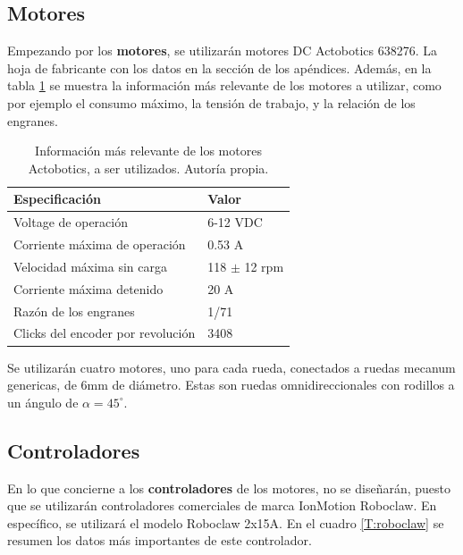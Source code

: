 \subsection{Motores}

Empezando por los \textbf{motores}, se utilizarán motores DC Actobotics 638276. La hoja de fabricante con los datos en la sección de los apéndices. Además, en la tabla \ref{T:actobotics} se muestra la información más relevante de los motores a utilizar, como por ejemplo el consumo máximo, la tensión de trabajo, y la relación de los engranes.

\begin{table}[H]
\caption{Información más relevante de los motores Actobotics, a ser utilizados. Autoría propia.}
\begin{tabular}{|l|l|}
\hline
Especificación                & Valor         \\ \hline
Voltage de operación          & 6-12 VDC      \\ \hline
Corriente máxima de operación & 0.53 A        \\ \hline
Velocidad máxima sin carga    & 118 $\pm$ 12 rpm \\ \hline
Corriente máxima detenido     & 20 A          \\ \hline
Razón de los engranes         & 1/71          \\ \hline
Clicks del encoder por revolución & 3408      \\ \hline
\end{tabular}
\label{T:actobotics}
\end{table}

Se utilizarán cuatro motores, uno para cada rueda, conectados a ruedas mecanum genericas, de 6mm de diámetro. Estas son ruedas omnidireccionales con rodillos a un ángulo de $\alpha = 45^\circ$.

\subsection{Controladores}

En lo que concierne a los \textbf{controladores} de los motores, no se diseñarán, puesto que se utilizarán controladores comerciales de marca IonMotion Roboclaw. En específico, se utilizará el modelo Roboclaw 2x15A. En el cuadro \ref{T:roboclaw} se resumen los datos más importantes de este controlador.

